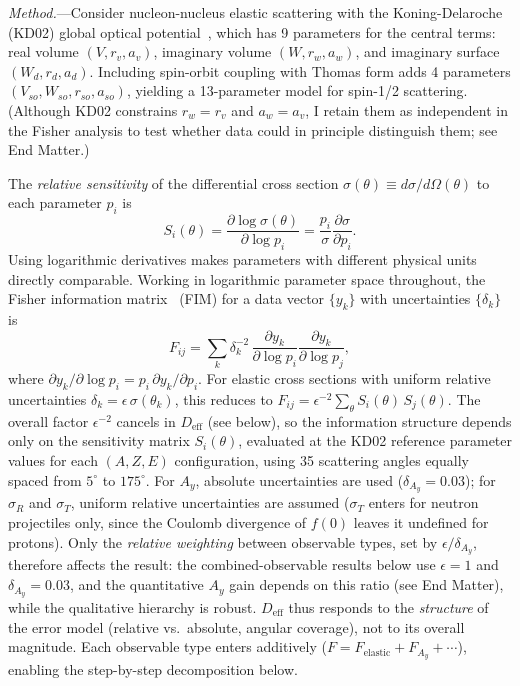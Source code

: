 \documentclass[aps,prl,reprint,superscriptaddress,showpacs,floatfix]{revtex4-2}
\begin{document}
\textit{Method.}---Consider nucleon-nucleus elastic scattering with the Koning-Delaroche (KD02) global optical potential~\cite{Becchetti1969,Varner1991,Koning2003}, which has 9 parameters for the central terms: real volume $(V, r_v, a_v)$, imaginary volume $(W, r_w, a_w)$, and imaginary surface $(W_d, r_d, a_d)$. Including spin-orbit coupling with Thomas form adds 4 parameters $(V_{so}, W_{so}, r_{so}, a_{so})$, yielding a 13-parameter model for spin-1/2 scattering. (Although KD02 constrains $r_w = r_v$ and $a_w = a_v$, I retain them as independent in the Fisher analysis to test whether data could in principle distinguish them; see End Matter.)

The \emph{relative sensitivity} of the differential cross section $\sigma(\theta) \equiv d\sigma/d\Omega(\theta)$ to each parameter $p_i$ is
\begin{equation}
S_i(\theta) = \frac{\partial \log \sigma(\theta)}{\partial \log p_i} = \frac{p_i}{\sigma} \frac{\partial \sigma}{\partial p_i}.
\end{equation}
Using logarithmic derivatives makes parameters with different physical units directly comparable. Working in logarithmic parameter space throughout, the Fisher information matrix~\cite{Fisher1925} (FIM) for a data vector $\{y_k\}$ with uncertainties $\{\delta_k\}$ is
\begin{equation}
F_{ij} = \sum_k \delta_k^{-2}\,\frac{\partial y_k}{\partial \log p_i}\frac{\partial y_k}{\partial \log p_j},
\end{equation}
where $\partial y_k / \partial \log p_i = p_i\,\partial y_k / \partial p_i$. For elastic cross sections with uniform relative uncertainties $\delta_k = \epsilon\,\sigma(\theta_k)$, this reduces to $F_{ij} = \epsilon^{-2} \sum_\theta S_i(\theta)\, S_j(\theta)$. The overall factor $\epsilon^{-2}$ cancels in $D_\mathrm{eff}$ (see below), so the information structure depends only on the sensitivity matrix $S_i(\theta)$, evaluated at the KD02 reference parameter values for each $(A, Z, E)$ configuration, using 35 scattering angles equally spaced from $5^\circ$ to $175^\circ$. For $A_y$, absolute uncertainties are used ($\delta_{A_y} = 0.03$); for $\sigma_R$ and $\sigma_T$, uniform relative uncertainties are assumed ($\sigma_T$ enters for neutron projectiles only, since the Coulomb divergence of $f(0)$ leaves it undefined for protons). Only the \emph{relative weighting} between observable types, set by $\epsilon / \delta_{A_y}$, therefore affects the result: the combined-observable results below use $\epsilon = 1$ and $\delta_{A_y} = 0.03$, and the quantitative $A_y$ gain depends on this ratio (see End Matter), while the qualitative hierarchy is robust. $D_\mathrm{eff}$ thus responds to the \emph{structure} of the error model (relative vs.\ absolute, angular coverage), not to its overall magnitude. Each observable type enters additively ($F = F_\mathrm{elastic} + F_{A_y} + \cdots$), enabling the step-by-step decomposition below.
\end{document}
